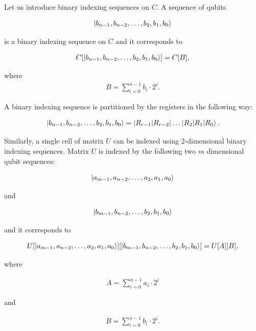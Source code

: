 Let us introduce binary indexing sequences on $C$. A sequence of qubits

\begin{align*}
\ket{b_{n-1},b_{n-2},\dots{},b_2,b_1,b_0}
\end{align*}

is a binary indexing sequence on $C$ and it corresponds to

\begin{align*}
C[\ket{b_{n-1},b_{n-2},\dots{},b_2,b_1,b_0}] = C[B],
\end{align*}

where
\begin{align*}
B = \sum\limits_{i=0}^{n-1}b_i\cdot{}2^{i}.
\end{align*}

A binary indexing sequence is partitioned by the registers in the following way:

\begin{align*}
\ket{b_{n-1},b_{n-2},\dots{},b_2,b_1,b_0} = \ket{R_{r-1} | R_{r-2} | \dots{} | R_2 | R_1 | R_0}.
\end{align*}

Similarly, a single cell of matrix $U$ can be indexed using 2-dimensional binary indexing sequences. Matrix $U$ is indexed by the following two $m$ dimensional qubit sequences:

\begin{align*}
\ket{a_{m-1},a_{n-2},\dots{},a_2,a_1,a_0}
\end{align*}

and

\begin{align*}
\ket{b_{m-1},b_{n-2},\dots{},b_2,b_1,b_0}
\end{align*}

and it corresponds to

\begin{align*}
U[\ket{a_{m-1},a_{n-2},\dots{},a_2,a_1,a_0}][\ket{b_{m-1},b_{n-2},\dots{},b_2,b_1,b_0}] = U[A][B],
\end{align*}

where

\begin{align*}
A = \sum\limits_{i=0}^{n-1}a_i\cdot{}2^{i}
\end{align*}

and

\begin{align*}
B = \sum\limits_{i=0}^{n-1}b_i\cdot{}2^{i}.
\end{align*}

